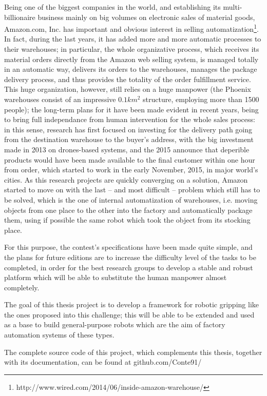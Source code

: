 Being one of the biggest companies in the world, and establishing its
multi-billionaire business mainly on big volumes on electronic sales
of material goods, Amazon.com, Inc. has important and obvious interest
in selling automatization\footnote{http://www.wired.com/2014/06/inside-amazon-warehouse/}. In fact, during the last years, it has
added more and more automatic processes to their warehouses; in
particular, the whole organizative process, which receives its
material orders directly from the Amazon web selling system, is
managed totally in an automatic way, delivers its orders to the
warehouses, manages the package delivery process, and thus provides
the totality of the order fulfillment service. This huge organization,
however, still relies on a huge manpower (the Phoenix warehouses
consist of an impressive $0.1\unit{km^2}$ structure, employing more
than 1500 people); the long-term plans for it have been made evident
in recent years, being to bring full independance from human intervention for the whole
sales process: in this sense, research has first focused on investing
for the delivery path going from the destination warehouse to the
buyer's address, with the big investment made in 2013 on drones-based
systems, and the 2015 announce that deperible products would have been
made available to the final customer within one hour from order, which
started to work in the early November, 2015, in major world's
cities. As this research projects are quickly converging on a
solution, Amazon started to move on with the last -- and most
difficult -- problem which still has to be solved, which is the one of
internal automatization of warehouses, i.e. moving objects from one
place to the other into the factory and automatically package them,
using if possible the same robot which took the object from its
stocking place.

For this purpose, the contest's specifications have been made quite simple, and the plans
for future editions are to increase the difficulty level of the tasks
to be completed, in order for the best research groups to develop a
stable and robust platform which will be able to substitute the human
manpower almost completely.

The goal of this thesis project is to develop a framework for robotic
gripping like the ones proposed into this challenge; this will be able
to be extended and used as a base to build general-purpose robots
which are the aim of factory automation systems of these types.

The complete source code of this project, which complements this
thesis, together with its documentation, can be found at github.com/Conte91/

